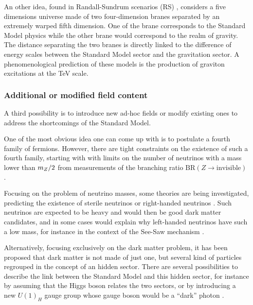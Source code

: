         An other idea, found in Randall-Sundrum scenarios (RS) \cite{RS}, considers a five
        dimensions universe made of two four-dimension branes separated by an extremely
        warped fifth dimension. One of the brane corresponds to the Standard Model physics
        while the other brane would correspond to the realm of gravity. The distance
        separating the two branes is directly linked to the difference of energy scales
        between the Standard Model sector and the gravitation sector. A phenomenological
        prediction of these models is the production of graviton excitations at the TeV
        scale.

        \subsubsection{Additional or modified field content}

        A third possibility is to introduce new ad-hoc fields or modify existing ones
        to address the shortcomings of the Standard Model.

        One of the most obvious idea
        one can come up with is to postulate a fourth family of fermions. However, there are
        tight constraints on the existence of such a fourth family, starting with with
        limits on the number of neutrinos with a mass lower than $m_{Z}/2$ from measurements
        of the branching ratio $\text{BR}(Z \rightarrow \text{invisible})$ \cite{PDFNumberOfNeutrinos}.

        Focusing on the problem of neutrino masses, some theories are being investigated,
        predicting the existence of sterile neutrinos or right-handed neutrinos \cite{RHNeutrinos}. Such neutrinos
        are expected to be heavy and would then be good dark matter candidates, and in some
        cases would explain why left-handed neutrinos have such a low mass, for instance
        in the context of the See-Saw mechanism \cite{Seesaw}.

        Alternatively, focusing exclusively on the dark matter problem, it has been proposed
        that dark matter is not made of just one, but several kind of particles regrouped
        in the concept of an hidden sector. There are several possibilities to describe
        the link between the Standard Model and this hidden sector, for instance by assuming
        that the Higgs boson relates the two sectors, or by introducing a new $U(1)_H$ gauge
        group whose gauge boson would be a ``dark'' photon .

